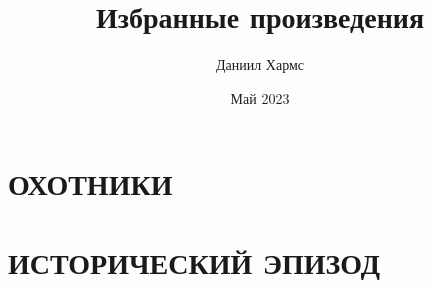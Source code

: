 \documentclass{article}
\title{Избранные произведения}
\author{Даниил Хармс}
\date{Май 2023}
\begin{document}
\maketitle

\section{ОХОТНИКИ}


\section{ИСТОРИЧЕСКИЙ ЭПИЗОД}

\end{document}
